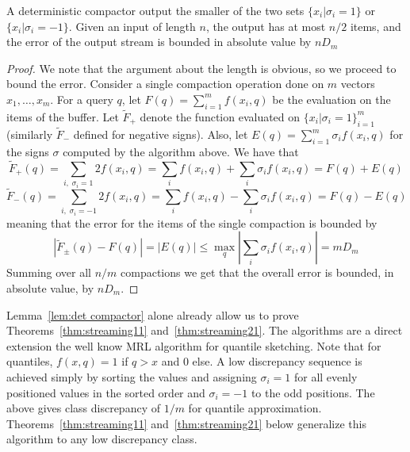 \documentclass[12pt]{colt2019} %
\begin{document}
\begin{lemma} \label{lem:det compactor}
A deterministic compactor output the smaller of the two sets  $\{ x_i | \sigma_i = 1\}$ or  $\{ x_i | \sigma_i = -1\}$. Given an input of length $n$, the output has at most $n/2$ items, and the error of the output stream is bounded in absolute value by $nD_m$
\end{lemma}
\begin{proof}
We note that the argument about the length is obvious, so we proceed to bound the error. Consider a single compaction operation done on $m$ vectors $x_1,\ldots,x_m$. For a query $q$, let $F(q)=\sum_{i=1}^m f(x_i,q)$ be the evaluation on the items of the buffer. Let $\tilde F_{+}$ denote the function evaluated on $\{ x_i | \sigma_i = 1\}_{i=1}^m$ (similarly $\tilde F_{-}$ defined for negative signs). Also, let $E(q) = \sum_{i=1}^m \sigma_i f(x_i,q)$ for the signs $\sigma$ computed by the algorithm above. We have that 
$$\tilde F_{+}(q) = \sum_{i ,\; \sigma_i=1} 2f(x_i, q) = \sum_{i} f(x_i, q) +  \sum_{i} \sigma_i f(x_i, q) = F(q) + E(q)$$
$$\tilde F_{-}(q) = \sum_{i ,\; \sigma_i=-1} 2f(x_i, q) = \sum_{i} f(x_i, q) - \sum_{i} \sigma_i f(x_i, q) = F(q) - E(q)$$
meaning that the error for the items of the single compaction is bounded by
$$|\tilde F_{\pm}(q) - F(q)| = |E(q)| \le \max_q |\sum_i \sigma_i f(x_i,q)| = mD_m$$
Summing over all $n/m$ compactions we get that the overall error is bounded, in absolute value, by $nD_m$.
\end{proof}

Lemma~\ref{lem:det compactor} alone already allow us to prove Theorems~\ref{thm:streaming11} and~\ref{thm:streaming21}. 
The algorithms are a direct extension the well know MRL algorithm \cite{MRL} for quantile sketching. 
Note that for quantiles, $f(x,q) = 1$ if $q > x$ and $0$ else. 
A low discrepancy sequence is achieved simply by sorting the values and assigning $\sigma_i = 1$ for all evenly positioned values in the sorted order and $\sigma_i=-1$ to the odd positions. The above gives class discrepancy of $1/m$ for quantile approximation.
Theorems~\ref{thm:streaming11} and~\ref{thm:streaming21} below generalize this algorithm to any low discrepancy class.
\end{document}
